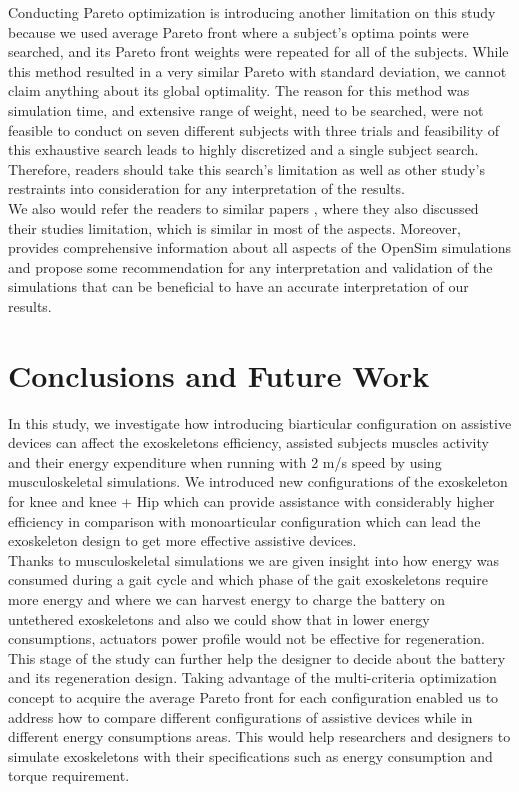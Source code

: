 \documentclass[10pt,letterpaper]{article}
\begin{document}
Conducting Pareto optimization is introducing another limitation on this study because we used average Pareto front where a subject's optima points were searched, and its Pareto front weights were repeated for all of the subjects. While this method resulted in a very similar Pareto with standard deviation, we cannot claim anything about its global optimality. The reason for this method was simulation time,  and extensive range of weight, need to be searched, were not feasible to conduct on seven different subjects with three trials and feasibility of this exhaustive search leads to highly discretized and a single subject search. Therefore, readers should take this search's limitation as well as other study's restraints into consideration for any interpretation of the results.\\
We also would refer the readers to similar papers \cite{2,93}, where they also discussed their studies limitation, which is similar in most of the aspects. Moreover,\cite{92} provides comprehensive information about all aspects of the OpenSim simulations and propose some recommendation for any interpretation and validation of the simulations that can be beneficial to have an accurate interpretation of our results.
\section*{Conclusions and Future Work}
In this study, we investigate how introducing biarticular configuration on assistive devices can affect the exoskeletons efficiency, assisted subjects muscles activity and their energy expenditure when running with 2 m/s speed by using musculoskeletal simulations. We introduced new configurations of the exoskeleton for knee and knee + Hip which can provide assistance with considerably higher efficiency in comparison with monoarticular configuration which can lead the exoskeleton design to get more effective assistive devices.\\
Thanks to musculoskeletal simulations we are given insight into how energy was consumed during a gait cycle and which phase of the gait exoskeletons require more energy and where we can harvest energy to charge the battery on untethered exoskeletons and also we could show that in lower energy consumptions, actuators power profile would not be effective for regeneration. This stage of the study can further help the designer to decide about the battery and its regeneration design.
Taking advantage of the multi-criteria optimization concept to acquire the average Pareto front for each configuration enabled us to address how to compare different configurations of assistive devices while in different energy consumptions areas. This would help researchers and designers to simulate exoskeletons with their specifications such as energy consumption and torque requirement.\\
\end{document}
